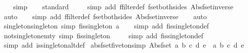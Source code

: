 \begin{isabellebody}
%
\isadelimproof
\ \ %
\endisadelimproof
%
\isatagproof
{}\isamarkupfalse%
\ simp\isanewline
\ \ \isamarkupfalse%
\ standard\isanewline
\ \ \ \isamarkupfalse%
\ {\isacharparenleft}simp\ add{\isacharcolon}\ ffilter{\isacharunderscore}def\ fset{\isacharunderscore}both{\isacharunderscore}sides\ Abs{\isacharunderscore}fset{\isacharunderscore}inverse{\isacharparenright}\isanewline
\ \ \ \isamarkupfalse%
\ auto{\isacharbrackleft}{}{\isacharbrackright}\isanewline
\ \ \isamarkupfalse%
\ {\isacharparenleft}simp\ add{\isacharcolon}\ ffilter{\isacharunderscore}def\ fset{\isacharunderscore}both{\isacharunderscore}sides\ Abs{\isacharunderscore}fset{\isacharunderscore}inverse{\isacharparenright}\isanewline
\ \ \isamarkupfalse%
\ auto%
\endisatagproof
{\isafoldproof}%
%
\isadelimproof
\isanewline
%
\endisadelimproof
\isanewline
{}\isamarkupfalse%
\ singleton{\isacharunderscore}singleton\ {\isacharbrackleft}simp{\isacharbrackright}{\isacharcolon}\ {\isachardoublequoteopen}fis{\isacharunderscore}singleton\ {\isacharbraceleft}{\isacharbar}a{\isacharbar}{\isacharbraceright}{\isachardoublequoteclose}\isanewline
%
\isadelimproof
\ \ %
\endisadelimproof
%
\isatagproof
{}\isamarkupfalse%
\ {\isacharparenleft}simp\ add{\isacharcolon}\ fis{\isacharunderscore}singleton{\isacharunderscore}def{\isacharparenright}%
\endisatagproof
{\isafoldproof}%
%
\isadelimproof
\isanewline
%
\endisadelimproof
\isanewline
{}\isamarkupfalse%
\ not{\isacharunderscore}singleton{\isacharunderscore}emty\ {\isacharbrackleft}simp{\isacharbrackright}{\isacharcolon}\ {\isachardoublequoteopen}{\isasymnot}fis{\isacharunderscore}singleton\ {\isacharbraceleft}{\isacharbar}{\isacharbar}{\isacharbraceright}{\isachardoublequoteclose}\isanewline
%
\isadelimproof
\ \ %
\endisadelimproof
%
\isatagproof
{}\isamarkupfalse%
\ {\isacharparenleft}simp\ add{\isacharcolon}\ fis{\isacharunderscore}singleton{\isacharunderscore}def{\isacharparenright}\isanewline
\ \ \isamarkupfalse%
\ {\isacharparenleft}simp\ add{\isacharcolon}\ is{\isacharunderscore}singleton{\isacharunderscore}altdef{\isacharparenright}%
\endisatagproof
{\isafoldproof}%
%
\isadelimproof
\isanewline
%
\endisadelimproof
\isanewline
{}\isamarkupfalse%
\ abs{\isacharunderscore}fset{\isacharunderscore}fiveton{\isacharbrackleft}simp{\isacharbrackright}{\isacharcolon}\ {\isachardoublequoteopen}Abs{\isacharunderscore}fset\ {\isacharbraceleft}a{\isacharcomma}\ b{\isacharcomma}\ c{\isacharcomma}\ d{\isacharcomma}\ e{\isacharbraceright}\ {\isacharequal}\ {\isacharbraceleft}{\isacharbar}a{\isacharcomma}\ b{\isacharcomma}\ c{\isacharcomma}\ d{\isacharcomma}\ e{\isacharbar}{\isacharbraceright}{\isachardoublequoteclose}\isanewline

\end{isabellebody}

